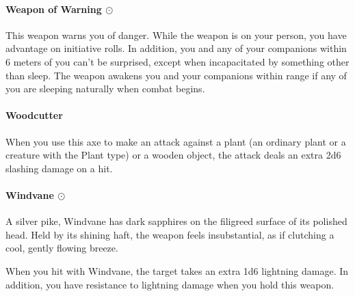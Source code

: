     \paragraph{Weapon of Warning $\odot$}
        This weapon warns you of danger.
        While the weapon is on your person, you have advantage on initiative rolls.
        In addition, you and any of your companions within 6 meters of you can't be surprised, except when incapacitated by something other than sleep.
        The weapon awakens you and your companions within range if any of you are sleeping naturally when combat begins.
    \paragraph{Woodcutter}
        When you use this axe to make an attack against a plant (an ordinary plant or a creature with the Plant type) or a wooden object, the attack deals an extra 2d6 slashing damage on a hit.
    \paragraph{Windvane $\odot$}
        A silver pike, Windvane has dark sapphires on the filigreed surface of its polished head.
        Held by its shining haft, the weapon feels insubstantial, as if clutching a cool, gently flowing breeze.

        When you hit with Windvane, the target takes an extra 1d6 lightning damage.
        In addition, you have resistance to lightning damage when you hold this weapon.


